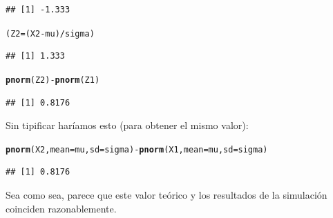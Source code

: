 \documentclass[10pt,a4paper]{article}\usepackage[]{graphicx}\usepackage[]{color}
\makeatletter
\newcommand{\hlopt}[1]{\textcolor[rgb]{0,0,0}{#1}}%
\newcommand{\hlstd}[1]{\textcolor[rgb]{0.345,0.345,0.345}{#1}}%
\newcommand{\hlkwb}[1]{\textcolor[rgb]{0.69,0.353,0.396}{#1}}%
\newcommand{\hlkwc}[1]{\textcolor[rgb]{0.333,0.667,0.333}{#1}}%
\newcommand{\hlkwd}[1]{\textcolor[rgb]{0.737,0.353,0.396}{\textbf{#1}}}%
\newenvironment{kframe}{%
 \def\at@end@of@kframe{}%
 \ifinner\ifhmode%
  \def\at@end@of@kframe{\end{minipage}}%
  \begin{minipage}{\columnwidth}%
 \fi\fi%
 \def\FrameCommand##1{\hskip\@totalleftmargin \hskip-\fboxsep
 \colorbox{shadecolor}{##1}\hskip-\fboxsep
     \hskip-\linewidth \hskip-\@totalleftmargin \hskip\columnwidth}%
 \MakeFramed {\advance\hsize-\width
   \@totalleftmargin\z@ \linewidth\hsize
   \@setminipage}}%
 {\par\unskip\endMakeFramed%
 \at@end@of@kframe}
\newenvironment{knitrout}{}{} %
\makeatother
\begin{document}
\begin{enumerate}
\begin{knitrout}
\begin{kframe}
\begin{verbatim}
## [1] -1.333
\end{verbatim}
\begin{alltt}
  \hlstd{(Z2} \hlkwb{=} \hlstd{(X2} \hlopt{-} \hlstd{mu)} \hlopt{/} \hlstd{sigma)}
\end{alltt}
\begin{verbatim}
## [1] 1.333
\end{verbatim}
\begin{alltt}
  \hlkwd{pnorm}\hlstd{(Z2)} \hlopt{-} \hlkwd{pnorm}\hlstd{(Z1)}
\end{alltt}
\begin{verbatim}
## [1] 0.8176
\end{verbatim}
\end{kframe}
\end{knitrout}
        Sin tipificar haríamos esto (para obtener el mismo valor):
\begin{knitrout}
\color{fgcolor}\begin{kframe}
\begin{alltt}
  \hlkwd{pnorm}\hlstd{(X2,} \hlkwc{mean}\hlstd{=mu,} \hlkwc{sd}\hlstd{=sigma)} \hlopt{-} \hlkwd{pnorm}\hlstd{(X1,} \hlkwc{mean}\hlstd{=mu,} \hlkwc{sd}\hlstd{=sigma)}
\end{alltt}
\begin{verbatim}
## [1] 0.8176
\end{verbatim}
\end{kframe}
\end{knitrout}
        Sea como sea, parece que este valor teórico y los resultados de la simulación coinciden razonablemente.


\end{enumerate}
\end{document}
